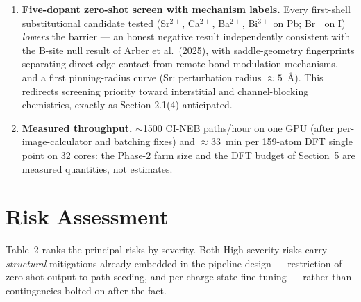 \documentclass[11pt,a4paper]{article}
\begin{document}
\begin{enumerate}[leftmargin=1.6em]
\item \textbf{Five-dopant zero-shot screen with mechanism labels.} Every first-shell
substitutional candidate tested (Sr$^{2+}$, Ca$^{2+}$, Ba$^{2+}$, Bi$^{3+}$ on Pb;
Br$^-$ on I) \emph{lowers} the barrier --- an honest negative result independently
consistent with the B-site null result of Arber et al.\ (2025), with saddle-geometry
fingerprints separating direct edge-contact from remote bond-modulation mechanisms,
and a first pinning-radius curve (Sr: perturbation radius $\approx 5$~\AA). This
redirects screening priority toward interstitial and channel-blocking chemistries,
exactly as Section 2.1(4) anticipated.

\item \textbf{Measured throughput.} $\sim$1500 CI-NEB paths/hour on one GPU (after
per-image-calculator and batching fixes) and $\approx$33~min per 159-atom DFT single
point on 32 cores: the Phase-2 farm size and the DFT budget of Section~5 are measured
quantities, not estimates.
\end{enumerate}

\section{Risk Assessment}

Table~2 ranks the principal risks by severity. Both High-severity risks carry
\emph{structural} mitigations already embedded in the pipeline design --- restriction
of zero-shot output to path seeding, and per-charge-state fine-tuning --- rather than
contingencies bolted on after the fact.
\end{document}
